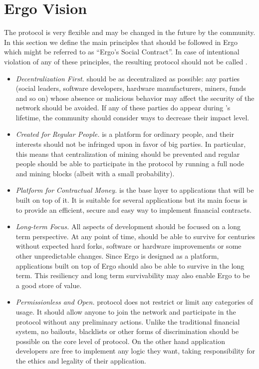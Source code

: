 \section{Ergo Vision}
\label{sec:social}


The \Ergo{} protocol is very flexible and may be changed in the future by the community.
In this section we define the main principles that should be followed in Ergo which
might be referred to as ``Ergo's Social Contract''.
In case of intentional violation of any of these principles, the resulting protocol should not
be called \Ergo{}.


\begin{itemize}
    \item{\em Decentralization First.} \Ergo{} should be as decentralized as possible: any parties (social leaders, software developers, hardware manufacturers, miners, funds and so on)
    whose absence or malicious behavior may affect the security of the network should be avoided.
    If any of these parties do appear during \Ergo{}'s lifetime, the community should consider ways to decrease their impact level.
    \item{\em Created for Regular People.} \Ergo{} is a platform for ordinary people, and their interests should not be infringed upon in favor of big parties.
    In particular, this means that centralization of mining should be prevented and regular people should be able to participate in the protocol by running a full node and mining blocks (albeit with a small probability).
    \item{\em Platform for Contractual Money.} \Ergo{} is the base layer to applications that will be built on top of it.
    It is suitable for several applications but its main focus is to provide an efficient, secure and easy way to implement financial contracts.
    \item{\em Long-term Focus.} All aspects of \Ergo{} development should be focused on a long term perspective.
    At any point of time, \Ergo{} should be able to survive for centuries without expected hard forks,
    software or hardware improvements or some other unpredictable changes.
    Since Ergo is designed as a platform, applications built on top of Ergo should also be able to survive in the long term.
    This resiliency and long term survivability may also enable Ergo to be a good store of value.
    \item{\em Permissionless and Open.} \Ergo{} protocol does not restrict or limit any categories of usage.
    It should allow anyone to join the network and participate in the protocol without any preliminary actions.
    Unlike the traditional financial system, no bailouts, blacklists or other forms of discrimination should be possible
    on the core level of \Ergo{} protocol.
    On the other hand application developers are free to implement any logic they want, taking responsibility for the ethics and legality of their application.
\end{itemize}